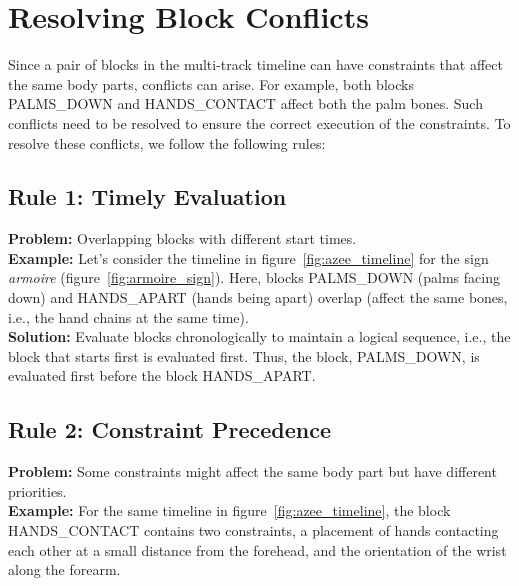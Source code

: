 \documentclass[../../main.tex]{subfiles}
\begin{document}
\section{Resolving Block Conflicts}
\label{ch:multi_track:resolve_conflicts}

Since a pair of blocks in the multi-track timeline can have constraints that affect the same body parts, conflicts can arise. For example, both blocks PALMS\_DOWN and HANDS\_CONTACT affect both the palm bones. Such conflicts need to be resolved to ensure the correct execution of the constraints. To resolve these conflicts, we follow the following rules:

\subsection{Rule 1: Timely Evaluation}
\label{ch:multi_track:resolve_conflicts:rule1}

\textbf{Problem:} Overlapping blocks with different start times. \\

\textbf{Example:} Let's consider the timeline in figure~\ref{fig:azee_timeline} for the sign \emph{armoire} (figure~\ref{fig:armoire_sign}). Here, blocks PALMS\_DOWN (palms facing down) and HANDS\_APART (hands being apart) overlap (affect the same bones, i.e., the hand chains at the same time).  \\

\textbf{Solution:} Evaluate blocks chronologically to maintain a logical sequence, i.e., the block that starts first is evaluated first. Thus, the block, PALMS\_DOWN, is evaluated first before the block HANDS\_APART.  \\

\subsection{Rule 2: Constraint Precedence}
\label{ch:multi_track:resolve_conflicts:rule2}

\textbf{Problem:} Some constraints might affect the same body part but have different priorities. \\

\textbf{Example:} For the same timeline in figure~\ref{fig:azee_timeline}, the block HANDS\_CONTACT contains two constraints, a placement of hands contacting each other at a small distance from the forehead, and the orientation of the wrist along the forearm. \\
\end{document}
